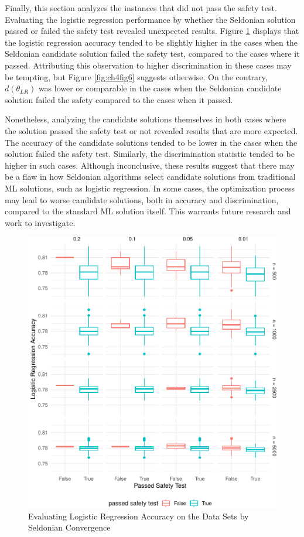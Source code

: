 \documentclass[12pt, twoside]{amherstthesis}
\begin{document}
Finally, this section analyzes the instances that did not pass the safety test. Evaluating the logistic regression performance by whether the Seldonian solution passed or failed the safety test revealed unexpected results. Figure \ref{fig:ch4fig5} displays that the logistic regression accuracy tended to be slightly higher in the cases when the Seldonian candidate solution failed the safety test, compared to the cases where it passed. Attributing this observation to higher discrimination in these cases may be tempting, but Figure \ref{fig:ch4fig6} suggests otherwise. On the contrary, \(d(\theta_{LR})\) was lower or comparable in the cases when the Seldonian candidate solution failed the safety compared to the cases when it passed.

Nonetheless, analyzing the candidate solutions themselves in both cases where the solution passed the safety test or not revealed results that are more expected. The accuracy of the candidate solutions tended to be lower in the cases when the solution failed the safety test. Similarly, the discrimination statistic tended to be higher in such cases. Although inconclusive, these results suggest that there may be a flaw in how Seldonian algorithms select candidate solutions from traditional ML solutions, such as logistic regression. In some cases, the optimization process may lead to worse candidate solutions, both in accuracy and discrimination, compared to the standard ML solution itself. This warrants future research and work to investigate.
\begin{figure}

{\centering \includegraphics{Dasha-Asienga_StatThesis_files/figure-latex/ch4fig5-1} 

}

\caption{Evaluating Logistic Regression Accuracy on the Data Sets by Seldonian Convergence}\label{fig:ch4fig5}
\end{figure}
\end{document}
